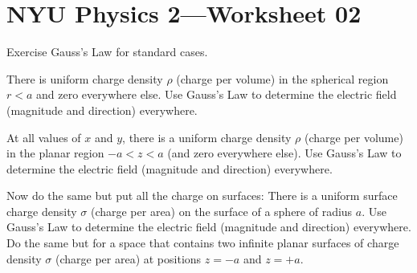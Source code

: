 \documentclass[12pt]{article}
\begin{document}
\section*{NYU Physics 2---Worksheet 02}

Exercise Gauss's Law for standard cases.

\startproblem%
There is uniform charge density $\rho$ (charge per volume) in the spherical region $r<a$ and zero everywhere else.
Use Gauss's Law to determine the electric field (magnitude and direction) everywhere.

\startproblem%
At all values of $x$ and $y$, there is a uniform charge density $\rho$ (charge per volume) in the planar region $-a<z<a$ (and zero everywhere else).
Use Gauss's Law to determine the electric field (magnitude and direction) everywhere.

\startproblem%
Now do the same but put all the charge on surfaces:
There is a uniform surface charge density $\sigma$ (charge per area) on the surface of a sphere of radius $a$.
Use Gauss's Law to determine the electric field (magnitude and direction) everywhere.
Do the same but for a space that contains two infinite planar surfaces of charge density $\sigma$ (charge per area) at positions $z=-a$ and $z=+a$.
\end{document}
